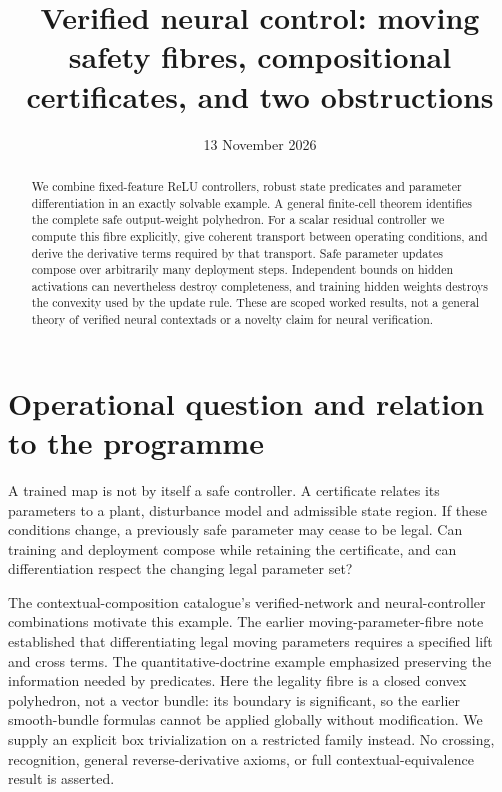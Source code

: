 \documentclass[11pt]{article}
\title{Verified neural control: moving safety fibres, compositional certificates, and two obstructions}
\author{}\date{13 November 2026}
\begin{document}
\maketitle
\begin{abstract}
We combine fixed-feature ReLU controllers, robust state predicates and parameter differentiation in an exactly solvable example. A general finite-cell theorem identifies the complete safe output-weight polyhedron. For a scalar residual controller we compute this fibre explicitly, give coherent transport between operating conditions, and derive the derivative terms required by that transport. Safe parameter updates compose over arbitrarily many deployment steps. Independent bounds on hidden activations can nevertheless destroy completeness, and training hidden weights destroys the convexity used by the update rule. These are scoped worked results, not a general theory of verified neural contextads or a novelty claim for neural verification.
\end{abstract}
\section{Operational question and relation to the programme}
A trained map is not by itself a safe controller. A certificate relates its parameters to a plant, disturbance model and admissible state region. If these conditions change, a previously safe parameter may cease to be legal. Can training and deployment compose while retaining the certificate, and can differentiation respect the changing legal parameter set?

The contextual-composition catalogue's verified-network and neural-controller combinations motivate this example. The earlier moving-parameter-fibre note established that differentiating legal moving parameters requires a specified lift and cross terms. The quantitative-doctrine example emphasized preserving the information needed by predicates. Here the legality fibre is a closed convex polyhedron, not a vector bundle: its boundary is significant, so the earlier smooth-bundle formulas cannot be applied globally without modification. We supply an explicit box trivialization on a restricted family instead. No crossing, recognition, general reverse-derivative axioms, or full contextual-equivalence result is asserted.
\end{document}
